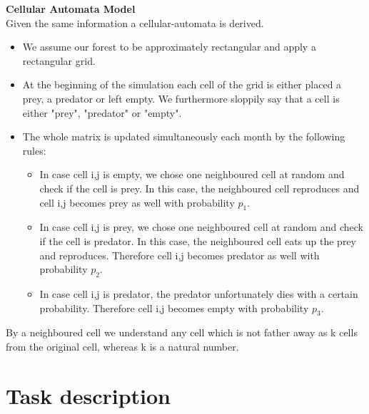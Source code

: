 \documentclass[a4paper,12pt]{article}
\begin{document}
\textbf{Cellular Automata Model}\\
Given the same information a cellular-automata is derived.\\
\begin{itemize}
\item{We assume our forest to be approximately rectangular and apply a rectangular grid.}
\item{At the beginning of the simulation each cell of the grid is either placed a prey, a predator or left
empty. We furthermore sloppily say that a cell is either "prey", "predator" or "empty".}
\item{The whole matrix is updated simultaneously each month by the following rules:}
\begin{itemize}
\item{In case cell i,j is empty, we chose one neighboured cell at random and check if the cell is prey. In
this case, the neighboured cell reproduces and cell i,j becomes prey as well with probability $p_1$.}
\item{In case cell i,j is prey, we chose one neighboured cell at random and check if the cell is predator.
In this case, the neighboured cell eats up the prey and reproduces. Therefore cell i,j becomes
predator as well with probability $p_2$.}
\item{In case cell i,j is predator, the predator unfortunately dies with a certain probability. Therefore
cell i,j becomes empty with probability $p_3$.}
\end{itemize}
\end{itemize}

By a neighboured cell we understand any cell which is not father away as k cells from the original cell,
whereas k is a natural number.



\section{Task description}
\end{document}
